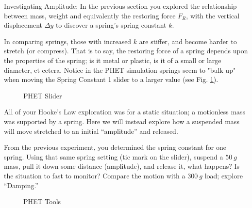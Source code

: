 \documentclass[14pt]{article}
\newcommand{\subheading}[1]{{\boldtenrm #1}}
\begin{document}

\newpage
\vphantom{}

\subheading{Investigating Amplitude}: In the previous section you explored the relationship between mass, weight and equivalently the restoring force $F_R$, with the vertical displacement $\Delta y$ to discover a spring's spring constant $k$.  

In comparing springs, those with increased $k$ are stiffer, and become harder to stretch (or compress). That is to say, the restoring force of a spring depends upon the properties of the spring; is it metal or plastic, is it of a small or large diameter, et cetera. Notice in the PHET simulation springs seem to "bulk up" when moving the Spring Constant 1 slider to a larger value (see Fig. \ref{fig:kslider}).

\begin{figure}
    \centering
    \caption{PHET Slider}
   \label{fig:kslider}
\end{figure}

All of your Hooke's Law exploration was for a static situation; a motionless mass was supported by a spring. Here we will instead explore how a suspended mass will move stretched to an initial ``amplitude'' and released.

From the previous experiment, you determined the spring constant for one spring.  Using that same spring setting (tic mark on the slider), suspend a $50~g$ mass, pull it down some distance (amplitude), and release it, what happens?  Is the situation to fast to monitor?  Compare the motion with a $300~g$ load; explore ``Damping.''

\begin{figure}
    \centering
    \caption{PHET Tools}
   \label{fig:tools}
\end{figure}
\end{document}
